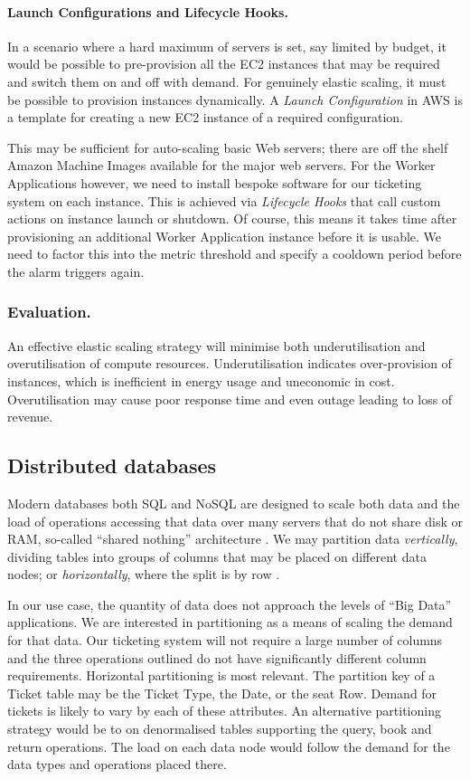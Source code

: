 \paragraph{Launch Configurations and Lifecycle Hooks.} In a scenario where a hard maximum of servers is set, say limited by budget, it would be possible to pre-provision all the EC2 instances that may be required and switch them on and off with demand.  For genuinely elastic scaling, it must be possible to provision instances dynamically.  A {\itshape Launch Configuration} in AWS is a template for creating a new EC2 instance of a required configuration.

This may be sufficient for auto-scaling basic Web servers; there are off the shelf Amazon Machine Images available for the major web servers.  For the Worker Applications however, we need to install bespoke software for our ticketing system on each instance.  This is achieved via {\itshape Lifecycle Hooks} that call custom actions on instance launch or shutdown.  Of course, this means it takes time after provisioning an additional Worker Application instance before it is usable.   We need to factor this into the metric threshold and specify a cooldown period before the alarm triggers again.

\subsubsection{Evaluation.}
An effective elastic scaling strategy will minimise both underutilisation and overutilisation of compute resources.  Underutilisation indicates over-provision of instances, which is inefficient in energy usage and uneconomic in cost.  Overutilisation may cause poor response time and even outage leading to loss of revenue.
\cite{espadas2013tenant}

\subsection{Distributed databases}
Modern databases both SQL and NoSQL are designed to scale both data and the load of operations accessing that data over many servers that do not share disk or RAM, so-called ``shared nothing'' architecture \cite{cattell2011scalable}.  We may partition data {\itshape vertically}, dividing tables into groups of columns that may be placed on different data nodes; or {\itshape horizontally}, where the split is by row \cite{agrawal2004integrating}. 

In our use case, the quantity of data does not approach the levels of ``Big Data'' applications.  We are interested in partitioning as a means of scaling the demand for that data.  Our ticketing system will not require a large number of columns and the three operations outlined do not have significantly different column requirements.  Horizontal partitioning is most relevant.  The partition key of a Ticket table may be the Ticket Type, the Date, or the seat Row.  Demand for tickets is likely to vary by each of these attributes.  An alternative partitioning strategy would be to on denormalised tables supporting the query, book and return operations.  The load on each data node would follow the demand for the data types and operations placed there.

